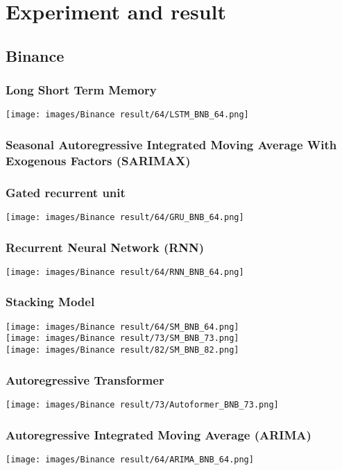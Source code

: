 \documentclass{ieeeojies}
\begin{document}
\section{Experiment and result}
\subsection{Binance}
\subsubsection{Long Short Term Memory}
    \texttt{[image: images/Binance result/64/LSTM\_BNB\_64.png]}\\
\subsubsection{Seasonal Autoregressive Integrated
Moving Average With Exogenous Factors
(SARIMAX)}
\subsubsection{Gated recurrent unit}
\texttt{[image: images/Binance result/64/GRU\_BNB\_64.png]}\\
\subsubsection{Recurrent Neural Network (RNN)}
\texttt{[image: images/Binance result/64/RNN\_BNB\_64.png]}\\
\subsubsection{Stacking Model}
\texttt{[image: images/Binance result/64/SM\_BNB\_64.png]}\\
\texttt{[image: images/Binance result/73/SM\_BNB\_73.png]}\\
\texttt{[image: images/Binance result/82/SM\_BNB\_82.png]}
\subsubsection{Autoregressive Transformer}
\texttt{[image: images/Binance result/73/Autoformer\_BNB\_73.png]}
\subsubsection{Autoregressive Integrated Moving Average (ARIMA)}
\texttt{[image: images/Binance result/64/ARIMA\_BNB\_64.png]}\\
\end{document}
